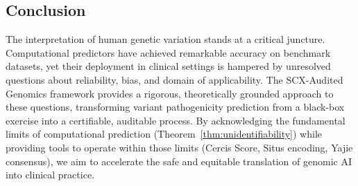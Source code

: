 \documentclass[11pt,a4paper]{article}
\theoremstyle{definition}
\newcommand{\SCX}{\textsc{SCX}}
\begin{document}
\subsection{Conclusion}
The interpretation of human genetic variation stands at a critical juncture.
Computational predictors have achieved remarkable accuracy on benchmark datasets, yet their deployment in clinical settings is hampered by unresolved questions about reliability, bias, and domain of applicability.
The \SCX-Audited Genomics framework provides a rigorous, theoretically grounded approach to these questions, transforming variant pathogenicity prediction from a black-box exercise into a certifiable, auditable process.
By acknowledging the fundamental limits of computational prediction (Theorem~\ref{thm:unidentifiability}) while providing tools to operate within those limits (Cercis Score, Situs encoding, Yajie consensus), we aim to accelerate the safe and equitable translation of genomic AI into clinical practice.
\FloatBarrier

\end{document}
